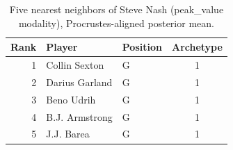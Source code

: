 \begin{table}[htbp]
  \centering\small
  \begin{tabular}{rllc}
    \toprule
    Rank & Player & Position & Archetype \\
    \midrule
    1 & Collin Sexton & G & 1 \\
    2 & Darius Garland & G & 1 \\
    3 & Beno Udrih & G & 1 \\
    4 & B.J. Armstrong & G & 1 \\
    5 & J.J. Barea & G & 1 \\
    \bottomrule
  \end{tabular}
  \caption{Five nearest neighbors of Steve Nash (peak_value modality), Procrustes-aligned posterior mean.}
  \label{tab:Steve_Nash_neighbors_peak_value}
\end{table}

